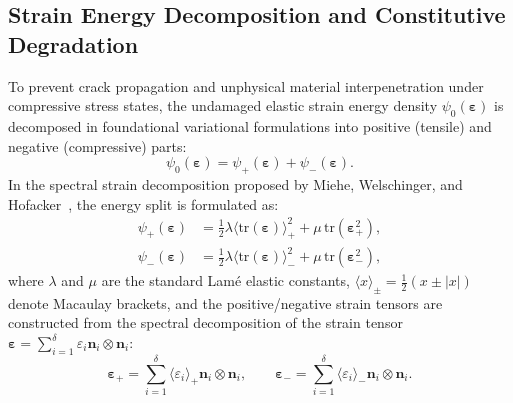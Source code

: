 \subsection{Strain Energy Decomposition and Constitutive Degradation}
To prevent crack propagation and unphysical material interpenetration under compressive stress states, the undamaged elastic strain energy density $\psi_0(\boldsymbol{\varepsilon})$ is decomposed in foundational variational formulations into positive (tensile) and negative (compressive) parts:
\begin{equation}
\label{eq:strain_energy_split}
\psi_0(\boldsymbol{\varepsilon}) = \psi_+(\boldsymbol{\varepsilon}) + \psi_-(\boldsymbol{\varepsilon}).
\end{equation}
In the spectral strain decomposition proposed by Miehe, Welschinger, and Hofacker~\cite{miehe2010a}, the energy split is formulated as:
\begin{align}
\label{eq:spectral_split_plus}
\psi_+(\boldsymbol{\varepsilon}) &= \frac{1}{2}\lambda \langle \mathrm{tr}(\boldsymbol{\varepsilon}) \rangle_+^2 + \mu \, \mathrm{tr}\left( \boldsymbol{\varepsilon}_+^2 \right), \\
\label{eq:spectral_split_minus}
\psi_-(\boldsymbol{\varepsilon}) &= \frac{1}{2}\lambda \langle \mathrm{tr}(\boldsymbol{\varepsilon}) \rangle_-^2 + \mu \, \mathrm{tr}\left( \boldsymbol{\varepsilon}_-^2 \right),
\end{align}
where $\lambda$ and $\mu$ are the standard Lamé elastic constants, $\langle x \rangle_{\pm} = \frac{1}{2}(x \pm |x|)$ denote Macaulay brackets, and the positive/negative strain tensors are constructed from the spectral decomposition of the strain tensor $\boldsymbol{\varepsilon} = \sum_{i=1}^{\delta} \varepsilon_i \mathbf{n}_i \otimes \mathbf{n}_i$:
\begin{equation}
\boldsymbol{\varepsilon}_+ = \sum_{i=1}^{\delta} \langle \varepsilon_i \rangle_+ \mathbf{n}_i \otimes \mathbf{n}_i, \qquad \boldsymbol{\varepsilon}_- = \sum_{i=1}^{\delta} \langle \varepsilon_i \rangle_- \mathbf{n}_i \otimes \mathbf{n}_i.
\end{equation}

